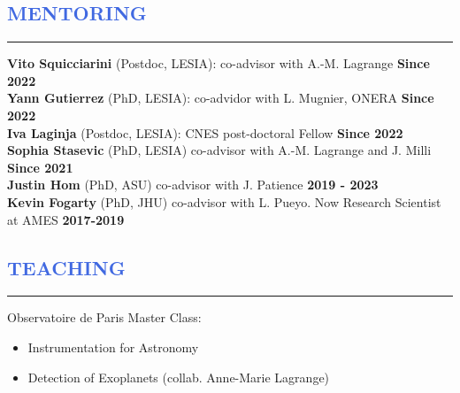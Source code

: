 \documentclass[11pt]{article}
\begin{document}
\vspace{-0.8cm}
\textcolor{RoyalBlue}{\section{\large MENTORING}
\vspace{-0.35cm}\hrule}
\vspace{0.4cm}
{\small
\textbf{Vito Squicciarini} (Postdoc, LESIA): co-advisor with A.-M. Lagrange \hfill \textbf{Since 2022}\\
\textbf{Yann Gutierrez} (PhD, LESIA): co-advidor with L. Mugnier, ONERA \hfill \textbf{Since 2022}\\
\textbf{Iva Laginja} (Postdoc, LESIA): CNES post-doctoral Fellow \hfill \textbf{Since 2022}\\
\textbf{Sophia Stasevic} (PhD, LESIA) co-advisor with A.-M. Lagrange and J. Milli \hfill \textbf{Since 2021}\\
\textbf{Justin Hom} (PhD, ASU) co-advisor with J. Patience \hfill \textbf{2019 - 2023}\\
\textbf{Kevin Fogarty} (PhD, JHU) co-advisor with L. Pueyo. Now Research Scientist at AMES \hfill \textbf{2017-2019}\\
}
\vspace{-0.cm}
\textcolor{RoyalBlue}{\section{\large TEACHING}
\vspace{-0.35cm}\hrule}
\vspace{0.4cm}
Observatoire de Paris Master Class: 
\begin{itemize} \itemsep -2pt
    \item Instrumentation for Astronomy 
    \item Detection of Exoplanets (collab. Anne-Marie Lagrange)
\end{itemize}



\end{document}

